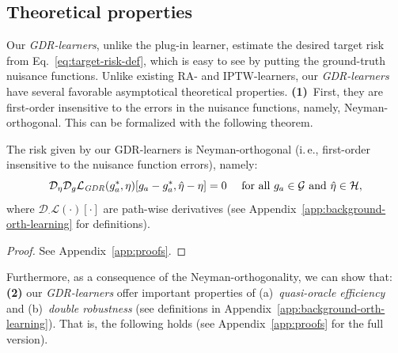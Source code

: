 \documentclass[dvipsnames]{article} %
\newcommand\ie{i.\,e.\xspace}
\newenvironment{numtheorem}[1]
  {\renewcommand\theinnercustomtheorem{#1}\innercustomtheorem}
  {\endinnercustomtheorem}
\newcommand{\GDRlearners}{\emph{GDR-learners}\xspace}
\begin{document}
\subsection{Theoretical properties}

Our \GDRlearners, unlike the plug-in learner, estimate the desired target risk from Eq.~\eqref{eq:target-risk-def}, which is easy to see by putting the ground-truth nuisance functions. Unlike existing RA- and IPTW-learners, our \GDRlearners have several favorable asymptotical theoretical properties. \textbf{(1)}~First, they are first-order insensitive to the errors in the nuisance functions, namely, Neyman-orthogonal. This can be formalized with the following theorem.

\begin{numtheorem}{1}[Neyman-orthogonality]\label{theor:no}
    The risk given by our GDR-learners is Neyman-orthogonal (\ie, first-order insensitive to the nuisance function errors), namely:
    \begin{equation}
        \mathcal{D}_\eta \mathcal{D}_g\mathcal{L}_\text{\emph{GDR}}(g_a^*, \eta)[g_a - g_a^*, \hat{\eta} - \eta] = 0 \quad \text{ for all $g_a \in \mathcal{G}$ and $\hat{\eta} \in \mathcal{H}$},
    \end{equation}
    where $\mathcal{D}_{\cdot} \mathcal{L}(\cdot)[\cdot]$ are path-wise derivatives (see Appendix~\ref{app:background-orth-learning} for definitions).
\end{numtheorem}
\vspace{-0.5cm}
\begin{proof}
    See Appendix~\ref{app:proofs}.
\end{proof}

Furthermore, as a consequence of the Neyman-orthogonality, we can show that: \textbf{(2)} our \GDRlearners offer important properties of (a)~\emph{quasi-oracle efficiency} and (b)~\emph{double robustness} \citep{chernozhukov2018double,nie2021quasi,foster2023orthogonal,morzywolek2023general} (see definitions in Appendix~\ref{app:background-orth-learning}). That is, the following holds (see Appendix~\ref{app:proofs} for the full version). 
\end{document}
